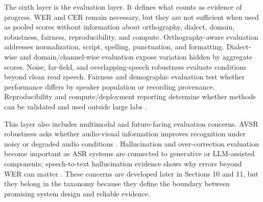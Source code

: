 \documentclass[pdflatex,sn-basic]{sn-jnl}
\theoremstyle{thmstyleone}
\theoremstyle{thmstyletwo}
\theoremstyle{thmstylethree}
\begin{document}
The sixth layer is the evaluation layer. It defines what counts as evidence of progress. WER and CER remain necessary, but they are not sufficient when used as pooled scores without information about orthography, dialect, domain, robustness, fairness, reproducibility, and compute. Orthography-aware evaluation addresses normalization, script, spelling, punctuation, and formatting. Dialect-wise and domain/channel-wise evaluation expose variation hidden by aggregate scores. Noise, far-field, and overlapping-speech robustness evaluate conditions beyond clean read speech. Fairness and demographic evaluation test whether performance differs by speaker population or recording provenance. Reproducibility and compute/deployment reporting determine whether methods can be validated and used outside large labs \citep{yang2021superb,karita2023lenient,cornell2023chime7,koenecke2020racialdisparities,liu2021casualconversations}.

This layer also includes multimodal and future-facing evaluation concerns. AVSR robustness asks whether audio-visual information improves recognition under noisy or degraded audio conditions \citep{shi2022avhubert,shi2022robustavsr,anwar23_interspeech}. Hallucination and over-correction evaluation become important as ASR systems are connected to generative or LLM-assisted components; speech-to-text hallucination evidence shows why errors beyond WER can matter \citep{koenecke2024carelesswhisper}. These concerns are developed later in Sections 10 and 11, but they belong in the taxonomy because they define the boundary between promising system design and reliable evidence.
\end{document}

